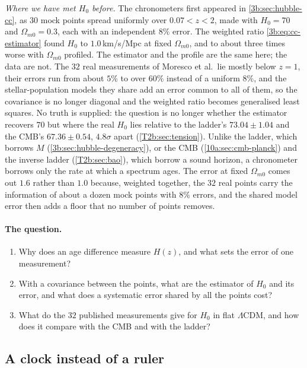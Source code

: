\emph{Where we have met $H_0$ before.} The chronometers first appeared in
\cref{3b:sec:hubble-cc}, as $30$ mock points spread uniformly over $0.07<z<2$, made
with $H_0=70$ and $\Omega_{m0}=0.3$, each with an independent $8\%$ error. The weighted
ratio \eqref{3b:eq:cc-estimator} found $H_0$ to $1.0$\,km/s/Mpc at fixed
$\Omega_{m0}$, and to about three times worse with $\Omega_{m0}$ profiled. The estimator
and the profile are the same here; the data are not. The $32$ real measurements of
Moresco et al.\ lie mostly below $z=1$, their errors run from about $5\%$ to over $60\%$
instead of a uniform $8\%$, and the stellar-population models they share add an error
common to all of them, so the covariance is no longer diagonal and the weighted ratio
becomes generalised least squares. No truth is supplied: the question is no longer
whether the estimator recovers $70$ but where the real $H_0$ lies relative to the
ladder's $73.04\pm1.04$ and the CMB's $67.36\pm0.54$, $4.8\sigma$ apart
(\cref{T2b:sec:tension}). Unlike the ladder, which borrows $M$
(\cref{3b:sec:hubble-degeneracy}), or the CMB (\cref{10a:sec:cmb-planck}) and the
inverse ladder (\cref{T2b:sec:bao}), which borrow a sound horizon, a chronometer
borrows only the rate at which a spectrum ages. The error at fixed $\Omega_{m0}$ comes
out $1.6$ rather than $1.0$ because, weighted together, the $32$ real points carry the
information of about a dozen mock points with $8\%$ errors, and the shared model error
then adds a floor that no number of points removes.

\paragraph{The question.}
\begin{enumerate}
  \item Why does an age difference measure $H(z)$, and what sets the error of one
        measurement?
  \item With a covariance between the points, what are the estimator of $H_0$ and its
        error, and what does a systematic error shared by all the points cost?
  \item What do the $32$ published measurements give for $H_0$ in flat $\Lambda$CDM,
        and how does it compare with the CMB and with the ladder?
\end{enumerate}

\subsection{A clock instead of a ruler}
\label{11c:sec:cc-clock}

